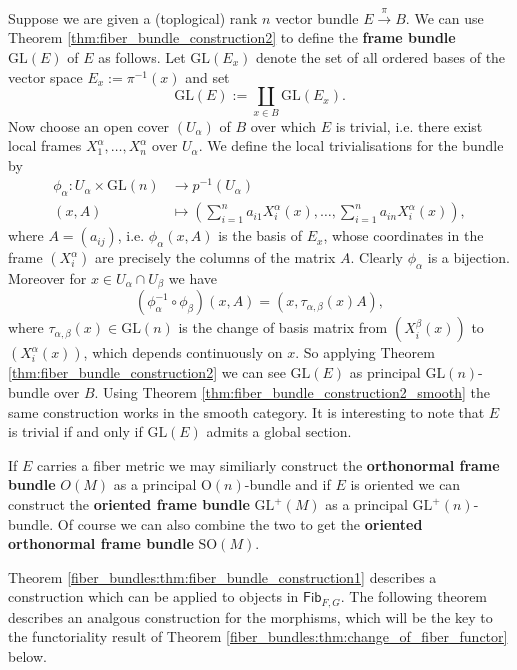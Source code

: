      \begin{example}
        \label{fiber_bundles:example:frame_bundle}
        Suppose we are given a (toplogical) rank $n$ vector bundle $E \xrightarrow{\pi} B$. We can use Theorem \ref{thm:fiber_bundle_construction2} to define the \textbf{frame bundle} $\mathrm{GL}(E)$ of $E$ as follows. Let $\mathrm{GL}(E_x)$ denote the set of all ordered bases of the vector space $E_x := \pi^{-1}(x)$ and set 
        \[
        \mathrm{GL}(E) := \coprod_{x \in B} \mathrm{GL}(E_x).
        \]
        Now choose an open cover $(U_\alpha)$ of $B$ over which $E$ is trivial, i.e. there exist local frames $X_1^\alpha,\ldots,X_n^\alpha$ over $U_\alpha$. We define the local trivialisations for the bundle by 
        \begin{align*}
            \phi_\alpha \colon U_\alpha \times \mathrm{GL}(n) &\to p^{-1}(U_\alpha) \\
            (x,A) &\mapsto \left(\sum_{i=1}^n a_{i1}X_i^\alpha(x),\ldots,\sum_{i=1}^n a_{in}X_i^\alpha(x)\right),
        \end{align*}
        where $A = (a_{ij})$, i.e. $\phi_\alpha(x,A)$ is the basis of $E_x$, whose coordinates in the frame $(X_i^\alpha)$ are precisely the columns of the matrix $A$. Clearly $\phi_\alpha$ is a bijection. Moreover for $x \in U_\alpha \cap U_\beta$ we have 
        \[
        (\phi_\alpha^{-1} \circ \phi_\beta)(x,A) = (x,\tau_{\alpha,\beta}(x)A),
        \]
        where $\tau_{\alpha,\beta}(x) \in \mathrm{GL}(n)$ is the change of basis matrix from $(X_i^\beta(x))$ to $(X_i^\alpha(x))$, which depends continuously on $x$. So applying Theorem \ref{thm:fiber_bundle_construction2} we can see $\mathrm{GL}(E)$ as principal $\mathrm{GL}(n)$-bundle over $B$. Using Theorem \ref{thm:fiber_bundle_construction2_smooth} the same construction works in the smooth category. It is interesting to note that $E$ is trivial if and only if $\mathrm{GL}(E)$ admits a global section.
        
        If $E$ carries a fiber metric we may similiarly construct the \textbf{orthonormal frame bundle} $O(M)$ as a principal $\mathrm{O}(n)$-bundle and if $E$ is oriented we can construct the \textbf{oriented frame bundle} $\mathrm{GL^+}(M)$ as a principal $\mathrm{GL^+}(n)$-bundle. Of course we can also combine the two to get the \textbf{oriented orthonormal frame bundle} $\mathrm{SO}(M)$.
     \end{example}

     Theorem \ref{fiber_bundles:thm:fiber_bundle_construction1} describes a construction which can be applied to objects in $\mathsf{Fib}_{F,G}$. The following theorem describes an analgous construction for the morphisms, which will be the key to the functoriality result of Theorem \ref{fiber_bundles:thm:change_of_fiber_functor} below.

